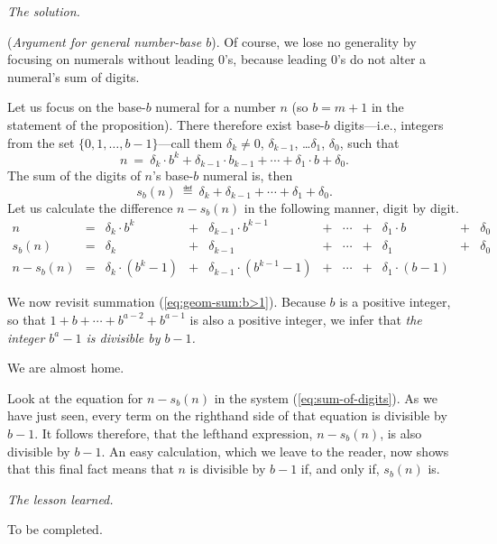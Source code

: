 \noindent \textit{The solution.}

({\it Argument for general number-base $b$}).
%
Of course, we lose no generality by focusing on numerals without
leading $0$'s, because leading $0$'s do not alter a numeral's sum of
digits.

Let us focus on the base-$b$ numeral for a number $n$ (so $b = m+1$ in
the statement of the proposition).  There therefore exist base-$b$
digits---i.e., integers from the set $\{0, 1, \ldots, b-1\}$---call
them $\delta_k \neq 0$, $\delta_{k-1}$, \ldots $\delta_1$, $\delta_0$,
such that
\[ n \ = \ \delta_k \cdot b^k + \delta_{k-1} \cdot b_{k-1} + \cdots +
\delta_1 \cdot b + \delta_0. \]
The sum of the digits of $n$'s base-$b$ numeral is, then
\[ s_b(n) \ \eqdef \ \delta_k + \delta_{k-1} + \cdots + \delta_1 +
\delta_0. \]
Let us calculate the difference $n - s_b(n)$ in the following manner,
digit by digit.
\begin{equation}
\label{eq:sum-of-digits}
\begin{array}{ccccccccccc}
n & = &
\delta_k \cdot b^k & + & \delta_{k-1} \cdot b^{k-1} & + & \cdots
  & + & \delta_1 \cdot b & + & \delta_0 \\
s_b(n) & = &
\delta_k & + & \delta_{k-1} & + & \cdots & + & \delta_1 & + & \delta_0 \\
\hline
n - s_b(n) & = &
\delta_k \cdot (b^k -1) & + &
\delta_{k-1} \cdot (b^{k-1} -1) & + &
\cdots & + &
\delta_1 \cdot (b-1) & & 
\end{array}
\end{equation}

We now revisit summation (\ref{eq:geom-sum:b>1}).  Because $b$ is a
positive integer, so that $1 + b + \cdots + b^{a-2} + b^{a-1}$ is also
a positive integer, we infer that {\em the integer $b^a -1$ is
  divisible by $b-1$.}

We are almost home.  

Look at the equation for $n - s_b(n)$ in the
system (\ref{eq:sum-of-digits}).  As we have just seen, every term on
the righthand side of that equation is divisible by $b-1$.  It follows
therefore, that the lefthand expression, $n - s_b(n)$, is also
divisible by $b-1$.
An easy calculation, which we leave to the reader, now shows that this
final fact means that $n$ is divisible by $b-1$ if, and only if, $s_b(n)$ is.
\medskip

\noindent \textit{The lesson learned.}

To be completed.



